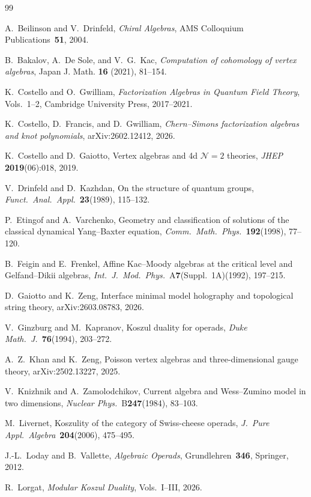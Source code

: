 \documentclass[11pt,reqno]{amsart}
\theoremstyle{definition}
\theoremstyle{remark}
\numberwithin{equation}{section}
\begin{document}

\begin{thebibliography}{99}

A.~Beilinson and V.~Drinfeld,
\emph{Chiral Algebras},
AMS Colloquium Publications~\textbf{51}, 2004.

B.~Bakalov, A.~De Sole, and V.~G.~Kac,
\emph{Computation of cohomology of vertex algebras},
Japan J. Math. \textbf{16} (2021), 81--154.

K.~Costello and O.~Gwilliam,
\emph{Factorization Algebras in Quantum Field Theory}, Vols.~1--2,
Cambridge University Press, 2017--2021.

K.~Costello, D.~Francis, and D.~Gwilliam,
\emph{Chern--Simons factorization algebras and knot polynomials},
arXiv:2602.12412, 2026.

K.~Costello and D.~Gaiotto,
Vertex algebras and 4d $\mathcal{N}=2$ theories,
\emph{JHEP} \textbf{2019}(06):018, 2019.

V.~Drinfeld and D.~Kazhdan,
On the structure of quantum groups,
\emph{Funct.\ Anal.\ Appl.}\ \textbf{23}(1989), 115--132.

P.~Etingof and A.~Varchenko,
Geometry and classification of solutions of the classical dynamical
Yang--Baxter equation,
\emph{Comm.\ Math.\ Phys.}\ \textbf{192}(1998), 77--120.

B.~Feigin and E.~Frenkel,
Affine Kac--Moody algebras at the critical level and Gelfand--Dikii
algebras,
\emph{Int.\ J.\ Mod.\ Phys.}\ A\textbf{7}(Suppl.\ 1A)(1992),
197--215.

D.~Gaiotto and K.~Zeng,
Interface minimal model holography and topological string theory,
arXiv:2603.08783, 2026.

V.~Ginzburg and M.~Kapranov,
Koszul duality for operads,
\emph{Duke Math.\ J.}\ \textbf{76}(1994), 203--272.

A.~Z.~Khan and K.~Zeng,
Poisson vertex algebras and three-dimensional gauge theory,
arXiv:2502.13227, 2025.

V.~Knizhnik and A.~Zamolodchikov,
Current algebra and Wess--Zumino model in two dimensions,
\emph{Nuclear Phys.}\ B\textbf{247}(1984), 83--103.

M.~Livernet,
Koszulity of the category of Swiss-cheese operads,
\emph{J.\ Pure Appl.\ Algebra}\ \textbf{204}(2006), 475--495.

J.-L.~Loday and B.~Vallette,
\emph{Algebraic Operads},
Grundlehren~\textbf{346}, Springer, 2012.

R.~Lorgat,
\emph{Modular Koszul Duality},
Vols.~I--III, 2026.

\end{thebibliography}
\end{document}
